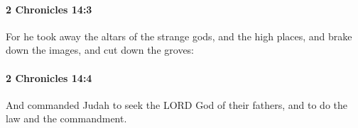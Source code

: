 		\paragraph{2 Chronicles 14:3} %
			\label{2CHRONICLES-14-3}

			For he took away the altars of the strange gods, and the high places, and brake down the images, and cut down the groves:


		\paragraph{2 Chronicles 14:4} %
			\label{2CHRONICLES-14-4}

			And commanded Judah to seek the LORD God of their fathers, and to do the law and the commandment.


